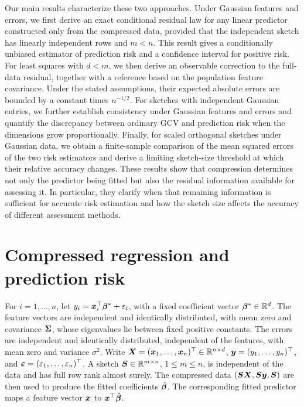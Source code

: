 \documentclass{article}
\theoremstyle{plain} %
\theoremstyle{definition} %
\theoremstyle{definition} %
\begin{document}
Our main results characterize these two approaches. Under Gaussian features and errors, we first derive an exact conditional residual law for any linear predictor constructed only from the compressed data, provided that the independent sketch has linearly independent rows and $m<n$. This result gives a conditionally unbiased estimator of prediction risk and a confidence interval for positive risk. For least squares with $d<m$, we then derive an observable correction to the full-data residual, together with a reference based on the population feature covariance. Under the stated assumptions, their expected absolute errors are bounded by a constant times $n^{-1/2}$.
For sketches with independent Gaussian entries, we further establish consistency under Gaussian features and errors and quantify the discrepancy between ordinary GCV and prediction risk when the dimensions grow proportionally. Finally, for scaled orthogonal sketches under Gaussian data, we obtain a finite-sample comparison of the mean squared errors of the two risk estimators and derive a limiting sketch-size threshold at which their relative accuracy changes.
These results show that compression determines not only the predictor being fitted but also the residual information available for assessing it. In particular, they clarify when that remaining information is sufficient for accurate risk estimation and how the sketch size affects the accuracy of different assessment methods.


\section{Compressed regression and prediction risk}
\label{sec:meth}

For $i=1,\ldots,n$, let
$y_i=\boldsymbol{x}_i^\top\boldsymbol{\beta}^*+\varepsilon_i$, with a fixed coefficient vector
$\boldsymbol{\beta}^*\in{\mathbb{R}}^d$. The feature vectors are independent and identically
distributed, with mean zero and covariance $\boldsymbol{\Sigma}$, whose eigenvalues
lie between fixed positive constants. The errors are independent and
identically distributed, independent of the features, with mean zero and
variance $\sigma^2$. Write
$\boldsymbol{X}=(\boldsymbol{x}_1,\ldots,\boldsymbol{x}_n)^\top\in{\mathbb{R}}^{n\times d}$,
$\boldsymbol{y}=(y_1,\ldots,y_n)^\top$, and
${\boldsymbol{\varepsilon} }=(\varepsilon_1,\ldots,\varepsilon_n)^\top$.
A sketch $\boldsymbol{S}\in{\mathbb{R}}^{m\times n}$, $1\leq m\leq n$, is independent of the
data and has full row rank almost surely. The compressed data
$(\boldsymbol{S}\boldsymbol{X},\boldsymbol{S}\boldsymbol{y},\boldsymbol{S})$ are then used to produce the fitted coefficients
$\hat{\boldsymbol{\beta}}{}$. The corresponding fitted predictor maps a feature vector
$\boldsymbol{x}$ to $\boldsymbol{x}^\top\hat{\boldsymbol{\beta}}{}$.
\end{document}
